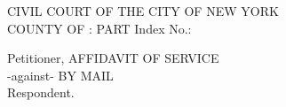 \documentclass[12pt]{article}
\begin{document}
\thispagestyle{empty} %

\newcommand{\checkbox}{\Square}

\noindent
CIVIL COURT OF THE CITY OF NEW YORK \\
COUNTY OF \underline{\hspace{3cm}} : PART \underline{\hspace{1.5cm}} \hfill Index No.: \underline{\hspace{4cm}}

\vspace{1em}
\noindent
Petitioner, \hfill AFFIDAVIT OF SERVICE \\
\vspace{0.5em}
\noindent
-against- \hfill BY MAIL \\
\vspace{0.5em}
\noindent
Respondent. \\
\vspace{1em}
\end{document}
